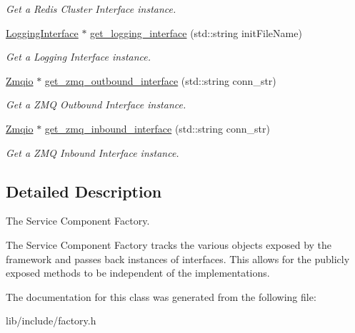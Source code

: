 \begin{DoxyCompactItemize}
\begin{DoxyCompactList}\small\item\em Get a Redis Cluster Interface instance. \end{DoxyCompactList}\item 
\hypertarget{classServiceComponentFactory_aa0bd65f6cb0e588ab97d51ba15733d31}{\hyperlink{classLoggingInterface}{Logging\-Interface} $\ast$ \hyperlink{classServiceComponentFactory_aa0bd65f6cb0e588ab97d51ba15733d31}{get\-\_\-logging\-\_\-interface} (std\-::string init\-File\-Name)}\label{classServiceComponentFactory_aa0bd65f6cb0e588ab97d51ba15733d31}

\begin{DoxyCompactList}\small\item\em Get a Logging Interface instance. \end{DoxyCompactList}\item 
\hypertarget{classServiceComponentFactory_a1d20e28c7b7c88d458598278245ae499}{\hyperlink{classZmqio}{Zmqio} $\ast$ \hyperlink{classServiceComponentFactory_a1d20e28c7b7c88d458598278245ae499}{get\-\_\-zmq\-\_\-outbound\-\_\-interface} (std\-::string conn\-\_\-str)}\label{classServiceComponentFactory_a1d20e28c7b7c88d458598278245ae499}

\begin{DoxyCompactList}\small\item\em Get a Z\-M\-Q Outbound Interface instance. \end{DoxyCompactList}\item 
\hypertarget{classServiceComponentFactory_a01ba58fc37d73d758774635d723dc7f9}{\hyperlink{classZmqio}{Zmqio} $\ast$ \hyperlink{classServiceComponentFactory_a01ba58fc37d73d758774635d723dc7f9}{get\-\_\-zmq\-\_\-inbound\-\_\-interface} (std\-::string conn\-\_\-str)}\label{classServiceComponentFactory_a01ba58fc37d73d758774635d723dc7f9}

\begin{DoxyCompactList}\small\item\em Get a Z\-M\-Q Inbound Interface instance. \end{DoxyCompactList}\end{DoxyCompactItemize}


\subsection{Detailed Description}
The Service Component Factory. 

The Service Component Factory tracks the various objects exposed by the framework and passes back instances of interfaces. This allows for the publicly exposed methods to be independent of the implementations. 

The documentation for this class was generated from the following file\-:\begin{DoxyCompactItemize}
\item 
lib/include/factory.\-h\end{DoxyCompactItemize}
